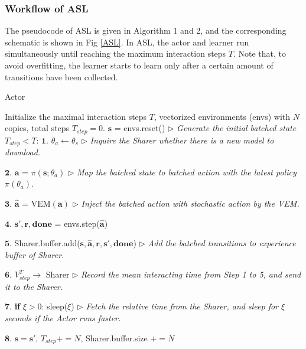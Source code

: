 \documentclass[journal]{IEEEtran}
\begin{document}
\subsubsection{Workflow of ASL}
The pseudocode of ASL is given in Algorithm 1 and 2, and the corresponding schematic is shown in Fig \ref{ASL}. In ASL, the actor and learner run simultaneously until reaching the maximum interaction steps $T$. Note that, to avoid overfitting, the learner starts to learn only after a certain amount of transitions have been collected.

\begin{algorithm}[!t]
	\caption{Actor}
	\begin{algorithmic}
		\STATE Initialize the maximal interaction steps $T$, vectorized environments (envs) with $N$ copies, total steps $T_{step}=0$.
		\STATE $\textbf{s}$ = envs.reset() \hspace{0.2cm} $\rhd$ \textit{Generate the initial batched state}
		 $T_{step}<T$:
		\STATE \hspace{0.5cm} $\textbf{1.}$ $\theta_{a} \leftarrow \theta_{s}$ \hspace{0.2cm} $\rhd$ \textit{Inquire the Sharer whether there is a new model to download.}
		
		\STATE \hspace{0.5cm} $\textbf{2.}$ $\textbf{a}$ = $\pi(\textbf{s}; \theta_{a})$ \hspace{0.2cm} $\rhd$ \textit{Map the batched state to batched action with the latest policy $\pi(\theta_{a})$.} 
		
		\STATE \hspace{0.48cm} $\textbf{3.}$ $\hat{\textbf{a}}$ = VEM$(\textbf{a})$  \hspace{0.2cm} $\rhd$ \textit{Inject the batched action with stochastic action by the VEM.}
		
		\STATE \hspace{0.53cm} $\textbf{4.}$ $ \textbf{s}', \textbf{r}, \textbf{done}$ = envs.step($\hat{\textbf{a}}$)
		
		\STATE \hspace{0.41cm} $\textbf{5.}$ Sharer.buffer.add($ \textbf{s}, \hat{\textbf{a}}, \textbf{r}, \textbf{s}', \textbf{done}$) \hspace{0.2cm} $\rhd$ \textit{Add the batched transitions to experience buffer of Sharer.}
		
		\STATE \hspace{0.5cm} $\textbf{6.}$ $V_{step}^{T} \rightarrow$ Sharer \hspace{0.2cm} $\rhd$ \textit{Record the mean interacting time from Step 1 to 5, and send it to the Sharer.}
		
		\STATE \hspace{0.5cm} $\textbf{7.}$ \textbf{if}  $\xi>0$: sleep($\xi$) \hspace{0.2cm} $\rhd$ \textit{Fetch the relative time from the Sharer, and sleep for $\xi$ seconds if the Actor runs faster.}
		
		\STATE \hspace{0.5cm} $\textbf{8.}$  $ \textbf{s} = \textbf{s}'$, $T_{step}+=N$, Sharer.buffer.size $+=N$
	\end{algorithmic}
\end{algorithm}
\end{document}

